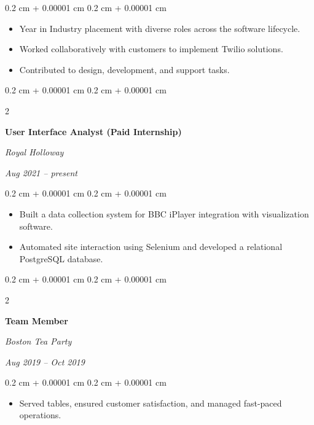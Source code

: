 \documentclass[10pt, letterpaper]{article}
\newenvironment{highlights}{
    \begin{itemize}[
        topsep=0.10 cm,
        parsep=0.10 cm,
        partopsep=0pt,
        itemsep=0pt,
        leftmargin=0.4 cm + 10pt
    ]
}{
    \end{itemize}
} %
\newenvironment{onecolentry}{
    \begin{adjustwidth}{
        0.2 cm + 0.00001 cm
    }{
        0.2 cm + 0.00001 cm
    }
}{
    \end{adjustwidth}
} %
\newenvironment{twocolentry}[2][]{
    \onecolentry
    \def\secondColumn{#2}
    \setcolumnwidth{\fill, 4.5 cm}
    \begin{paracol}{2}
}{
    \switchcolumn \raggedleft \secondColumn
    \end{paracol}
    \endonecolentry
} %
\begin{document}
        \vspace{0.10 cm}
        \begin{onecolentry}
            \begin{highlights}
                \item Year in Industry placement with diverse roles across the software lifecycle.
                \item Worked collaboratively with customers to implement Twilio solutions.
                \item Contributed to design, development, and support tasks.
            \end{highlights}
        \end{onecolentry}


        \vspace{0.2 cm}

        \begin{twocolentry}{
            
            
        \textit{Aug 2021 – present}}
            \textbf{User Interface Analyst (Paid Internship)}
            
            \textit{Royal Holloway}
        \end{twocolentry}

        \vspace{0.10 cm}
        \begin{onecolentry}
            \begin{highlights}
                \item Built a data collection system for BBC iPlayer integration with visualization software.
                \item Automated site interaction using Selenium and developed a relational PostgreSQL database.
            \end{highlights}
        \end{onecolentry}


        \vspace{0.2 cm}

        \begin{twocolentry}{
            
            
        \textit{Aug 2019 – Oct 2019}}
            \textbf{Team Member}
            
            \textit{Boston Tea Party}
        \end{twocolentry}

        \vspace{0.10 cm}
        \begin{onecolentry}
            \begin{highlights}
                \item Served tables, ensured customer satisfaction, and managed fast-paced operations.
            \end{highlights}
        \end{onecolentry}
\end{document}
